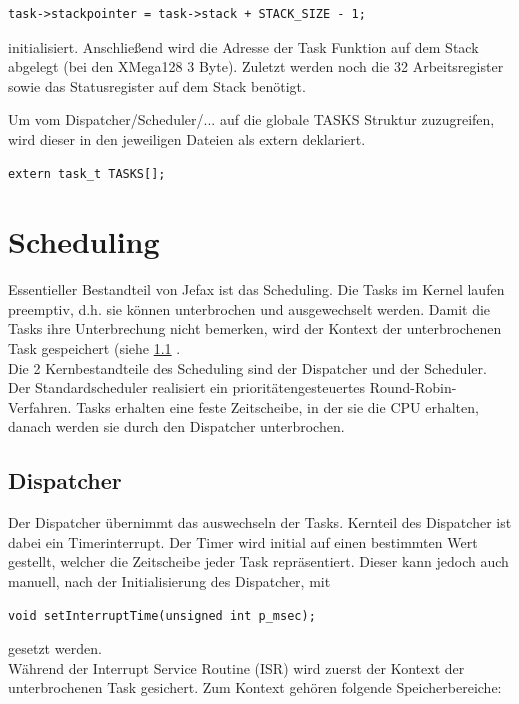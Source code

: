 \documentclass[fontsize=12pt, toc=bibliography, notitlepage]{scrreprt}
\newcommand{\refnn}[1]{\ref{#1} \nameref{#1}}
\begin{document}
\begin{lstlisting}
task->stackpointer = task->stack + STACK_SIZE - 1;
\end{lstlisting}

initialisiert. Anschließend wird die Adresse der Task Funktion auf dem Stack abgelegt (bei den XMega128 3 Byte). Zuletzt werden noch die 32 Arbeitsregister sowie das Statusregister auf dem Stack benötigt.

Um vom Dispatcher/Scheduler/... auf die globale TASKS Struktur zuzugreifen, wird dieser in den jeweiligen Dateien als extern deklariert.

\begin{lstlisting}
extern task_t TASKS[];
\end{lstlisting}

\chapter{Scheduling}
\label{chap:scheduling}
Essentieller Bestandteil von Jefax ist das Scheduling. Die Tasks im Kernel laufen preemptiv, d.h. sie können unterbrochen und ausgewechselt werden. Damit die Tasks ihre Unterbrechung nicht bemerken, wird der Kontext der unterbrochenen Task gespeichert (siehe \refnn{sec:dispatcher}.\\
Die 2 Kernbestandteile des Scheduling sind der Dispatcher und der Scheduler. Der Standardscheduler realisiert ein prioritätengesteuertes Round-Robin-Verfahren. Tasks erhalten eine feste Zeitscheibe, in der sie die CPU erhalten, danach werden sie durch den Dispatcher unterbrochen.

\section{Dispatcher}
\label{sec:dispatcher}
Der Dispatcher übernimmt das auswechseln der Tasks. Kernteil des Dispatcher ist dabei ein Timerinterrupt. Der Timer wird initial auf einen bestimmten Wert gestellt, welcher die Zeitscheibe jeder Task repräsentiert. Dieser kann jedoch auch manuell, nach der Initialisierung des Dispatcher, mit

\begin{lstlisting}
void setInterruptTime(unsigned int p_msec);
\end{lstlisting}

gesetzt werden.\\

Während der Interrupt Service Routine (ISR) wird zuerst der Kontext der unterbrochenen Task gesichert. Zum Kontext gehören folgende Speicherbereiche:
\end{document}
